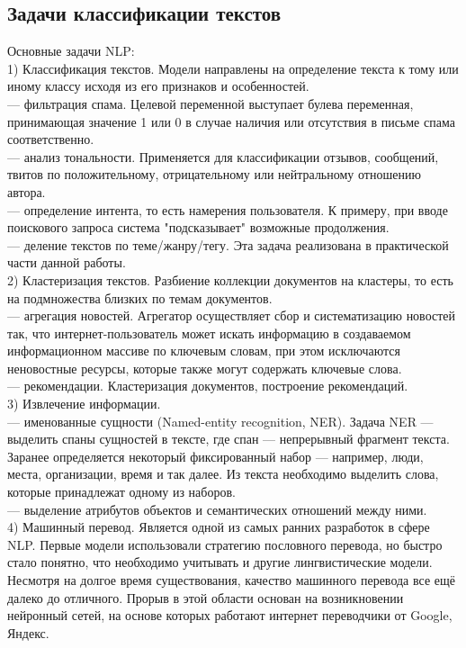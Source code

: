 \documentclass{article}
\newcommand\tab[1][1cm]{\hspace*{#1}}
\begin{document}
\subsection{Задачи классификации текстов}
Основные задачи NLP: \\
\tab1) Классификация текстов. Модели направлены на определение текста к тому или иному классу исходя из его признаков и особенностей.\\
\tab\tab— фильтрация спама. Целевой переменной выступает булева переменная, принимающая значение 1 или 0 в случае наличия или отсутствия в письме спама соответственно. \\
\tab\tab— анализ тональности. Применяется для классификации отзывов, сообщений, твитов по положительному, отрицательному или нейтральному отношению автора.\\
\tab\tab— определение интента, то есть намерения пользователя. К примеру, при вводе поискового запроса система "подсказывает" возможные продолжения.\\
\tab\tab— деление текстов по теме/жанру/тегу. Эта задача реализована в практической части данной работы.\\
\tab2) Кластеризация текстов. Разбиение коллекции документов на кластеры, то есть на подмножества близких по темам документов.\\
\tab\tab— агрегация новостей. Агрегатор осуществляет сбор и систематизацию новостей так, что интернет-пользователь может искать информацию в создаваемом информационном массиве по ключевым словам, при этом исключаются неновостные ресурсы, которые также могут содержать ключевые слова.\\
\tab\tab— рекомендации. Кластеризация документов, построение рекомендаций.\\
\tab3) Извлечение информации.\\
\tab\tab— именованные сущности (Named-entity recognition, NER). Задача NER — выделить спаны сущностей в тексте, где спан — непрерывный фрагмент текста. Заранее определяется некоторый фиксированный набор — например, люди, места, организации, время и так далее. Из текста необходимо выделить слова, которые принадлежат одному из наборов.\\
\tab\tab— выделение атрибутов объектов и семантических отношений между ними.\\
\tab4) Машинный перевод. Является одной из самых ранних разработок в сфере NLP. Первые модели использовали стратегию пословного перевода, но быстро стало понятно, что необходимо учитывать и другие лингвистические модели. Несмотря на долгое время существования, качество машинного перевода все ещё далеко до отличного. Прорыв в этой области основан на возникновении нейронный сетей, на основе которых работают интернет переводчики от Google, Яндекс.\\
\end{document}
